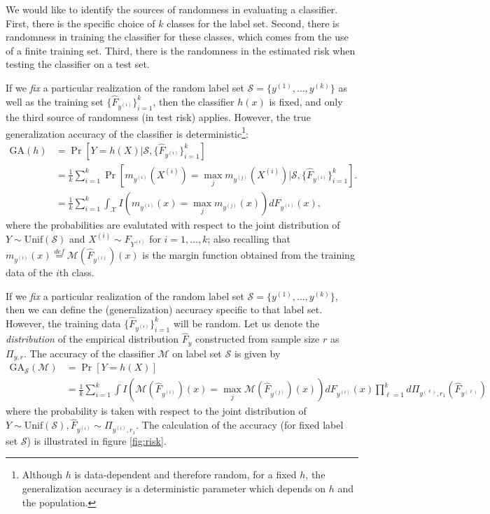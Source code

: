 We would like to identify the sources of randomness in evaluating a
classifier.  First, there is the specific choice of $k$ classes for
the label set.   Second, there is randomness in training the classifier
for these classes, which comes from the use of a finite training
set. Third, there is the randomness in the estimated risk when
testing the classifier on a test set.

If we \emph{fix} a particular realization of the random label set
$\mathcal{S} = \{y^{(1)}, \hdots, y^{(k)}\}$ as well as the training
set $\{\hat{F}_{y^{(i)}}\}_{i=1}^k$, then the classifier $h(x)$ is
fixed, and only the third source of randomness (in test risk) applies.
However, the true generalization accuracy of the classifier is deterministic\footnote{Although $h$ is data-dependent and therefore random, for a fixed $h$, the generalization accuracy is a deterministic parameter which depends on $h$ and the population.}:
\begin{align*}
\text{GA}(h) &= \Pr[Y = h(X)|
  \mathcal{S}, \{\hat{F}_{y^{(i)}}\}_{i=1}^k] 
\\&= \frac{1}{k}
\sum_{i=1}^k \Pr[m_{y^{(i)}}(X^{(i)}) = \max_j m_{y^{(j)}}(X^{(i)})|\mathcal{S}, \{\hat{F}_{y^{(i)}}\}_{i=1}^k].  
\\&= \frac{1}{k}
\sum_{i=1}^k \int_{\mathcal{X}} I(m_{y^{(i)}}(x) = \max_j m_{y^{(j)}}(x)) dF_{y^{(i)}}(x),
\end{align*}
where the probabilities are evalutated with respect to the joint distribution of $Y \sim \text{Unif}(\mathcal{S})$ and $X^{(i)} \sim F_{Y^{(i)}}$ for $i = 1,\hdots, k$; also recalling that $m_{y^{(i)}}(x) \stackrel{def}{=}
\mathcal{M}(\hat{F}_{y^{(i)}})(x)$ is the margin function obtained
from the training data of the $i$th class.

If we \emph{fix} a particular realization of the random label set
$\mathcal{S} = \{y^{(1)}, \hdots, y^{(k)}\}$, then we can define the
(generalization) accuracy specific to that label set.  However, the
training data $\{\hat{F}_{y^{(i)}}\}_{i=1}^k$ will be random.  Let us
denote the \emph{distribution} of the empirical distribution
$\hat{F}_y$ constructed from sample size $r$ as $\Pi_{y, r}$.  The
accuracy of the classifier $\mathcal{M}$ on label set $\mathcal{S}$ is
given by
\begin{align*}
\text{GA}_{\mathcal{S}}(\mathcal{M}) &= \Pr[Y = h(X)] \\&= \frac{1}{k} \sum_{i=1}^k \int
I(\mathcal{M}(\hat{F}_{y^{(i)}})(x) = \max_j
\mathcal{M}(\hat{F}_{y^{(j)}})(x)) dF_{y^{(i)}}(x) \prod_{\ell=1}^k
d\Pi_{y^{(\ell)}, r_1}(\hat{F}_{y^{(\ell)}})
\end{align*}
where the probability is taken with respect to the joint distribution of $Y \sim
  \text{Unif}(\mathcal{S}), \hat{F}_{y^{(i)}} \sim \Pi_{y^{(i)}, r_1}$.
The calculation of the accuracy (for fixed label set $\mathcal{S}$) is
illustrated in figure \ref{fig:risk}.


